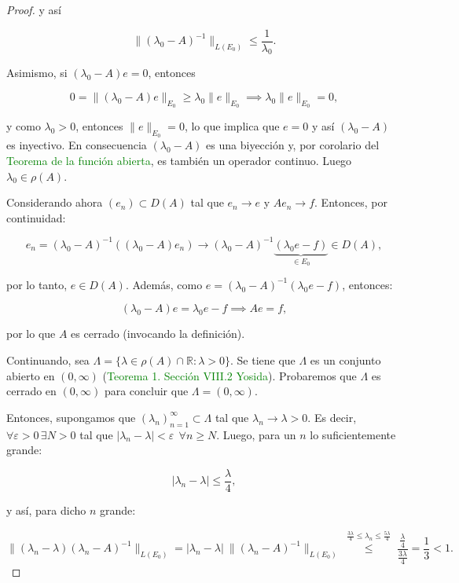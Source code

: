 \begin{proof}
    y así 
    
    \[\lVert (\lambda_0 - A)^{-1} \rVert_{L(E_0)} \leq \frac{1}{\lambda_0}.\]

    Asimismo, si $(\lambda_0 - A)e = 0$, entonces

    \[0 = \lVert (\lambda_0 - A)e \rVert_{E_0} \geq \lambda_0 \lVert e \rVert_{E_0} \implies \lambda_0 \lVert e \rVert_{E_0} = 0,\]

    y como $\lambda_0 > 0$, entonces $\lVert e \rVert_{E_0} = 0$, lo que implica que $e = 0$ y así $(\lambda_0 - A)$ es inyectivo. En consecuencia $(\lambda_0 - A)$ es una biyección y, por corolario del \textcolor{green}{Teorema de la función abierta}, es también un operador continuo. Luego $\lambda_0 \in \rho(A)$.

    Considerando ahora $(e_n) \subset D(A)$ tal que $e_n \rightarrow e$ y $Ae_n \rightarrow f$. Entonces, por continuidad:

    \[e_n = (\lambda_0 - A)^{-1}((\lambda_0 - A)e_n) \rightarrow (\lambda_0 - A)^{-1}\underbrace{(\lambda_0e - f)}_{\in E_0} \in D(A),\]

    por lo tanto, $e \in D(A)$. Además, como $e = (\lambda_0 - A)^{-1}(\lambda_0e - f)$, entonces:

    \[(\lambda_0 - A)e = \lambda_0e - f \implies Ae = f,\]

    por lo que $A$ es cerrado (invocando la definición).

    Continuando, sea $\Lambda = \{\lambda \in \rho(A) \cap \mathbb{R} : \lambda > 0\}$. Se tiene que $\Lambda$ es un conjunto abierto en $(0, \infty)$ (\textcolor{green}{Teorema 1. Sección VIII.2 Yosida}). Probaremos que $\Lambda$ es cerrado en $(0, \infty)$ para concluir que $\Lambda = (0, \infty)$.

    Entonces, supongamos que $(\lambda_n)_{n = 1}^\infty \subset \Lambda$ tal que $\lambda_n \rightarrow \lambda > 0$. Es decir, $\forall \varepsilon > 0 \, \exists N > 0$ tal que $|\lambda_n - \lambda | < \varepsilon \ \ \forall n \geq N$. Luego, para un $n$ lo suficientemente grande:

    \[|\lambda_n - \lambda| \leq \frac{\lambda}{4},\]

    y así, para dicho $n$ grande:

    \[\lVert (\lambda_n - \lambda)(\lambda_n - A)^{-1}\rVert_{L(E_0)} = |\lambda_n - \lambda| \ \lVert (\lambda_n - A)^{-1}\rVert_{L(E_0)} \overset{\substack{\frac{3\lambda}{4} \leq \lambda_n \leq \frac{5\lambda}{4}}}{\leq} \frac{\frac{\lambda}{4}}{\frac{3 \lambda}{4}} = \frac{1}{3} < 1.\]


\end{proof}

